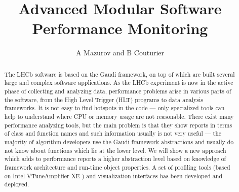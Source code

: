 \documentclass[a4paper]{jpconf}
\begin{document}
\title{Advanced Modular Software Performance Monitoring }
\author{A Mazurov and B Couturier}
\thispagestyle{fancy}
\address{ CERN, European Organization for Nuclear Research, Geneva, Switzerland}
\address{ University of Ferrara, Ferrara, Italy}
\address{ Institute for Nuclear Research, Troitsk, Russia}




\newcommand\iamp{{Intel\textsuperscript{\textregistered} VTune\texttrademark Amplifier XE} }
\newcommand\amp{{VTune\texttrademark Amplifier XE} }
\newcommand\intel{{Intel\textsuperscript{\textregistered}} }
\newcommand\google{{Google\textsuperscript{\textregistered} }}

\begin{abstract}
The LHCb software is based on the Gaudi framework, on top of which are built several large and complex software 
applications. As the LHCb experiment is now in the active phase of collecting and analyzing data, performance problems 
arise in various parts of the software, from the High Level Trigger (HLT) programs to data analysis frameworks. 
It is not easy to find hotspots in the code --- only specialized tools can help to understand where CPU or memory usage 
are not reasonable. There exist many performance analyzing tools, but the main problem is that they show reports in 
terms of class and function names and such information usually is not very useful --- the majority of algorithm 
developers use the Gaudi framework abstractions and usually do not know about functions which lie at the lower level. 
We will show a new approach which adds to performance reports a higher abstraction level based on knowledge of 
framework architecture and run-time object properties. A set of profiling tools (based on \iamp) and visualization 
interfaces has been developed and deployed.
\end{abstract}
\end{document}
